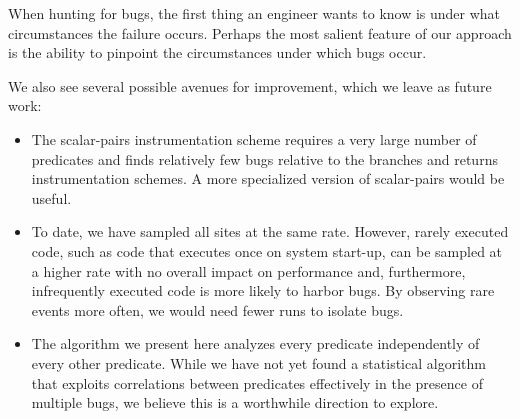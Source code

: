 \documentclass{sig-alternate}
\begin{document}
When hunting for bugs, the first thing an engineer wants to know is
under what circumstances the failure occurs.  Perhaps the most salient
feature of our approach is the ability to pinpoint the circumstances
under which bugs occur.

We also see several possible avenues for improvement, which we leave
as future work:
\begin{itemize}

\item The scalar-pairs instrumentation scheme requires a very large number
of predicates and finds relatively few bugs relative to the branches and
returns instrumentation schemes.  A more specialized version of scalar-pairs
would be useful.

\item To date, we have sampled all sites at the same rate.  However,
rarely executed code, such as code that executes once on system start-up,
can be sampled at a higher rate with no overall impact on performance and,
furthermore, infrequently executed code is more likely
to harbor bugs.  By observing rare events more often, we would need fewer
runs to isolate bugs.

\item The algorithm we present here analyzes every predicate independently
of every other predicate.  While we have not yet found a statistical algorithm that exploits
correlations between predicates effectively in the presence of
multiple bugs, we believe this is a worthwhile direction
to explore.
\end{itemize}



\end{document}
